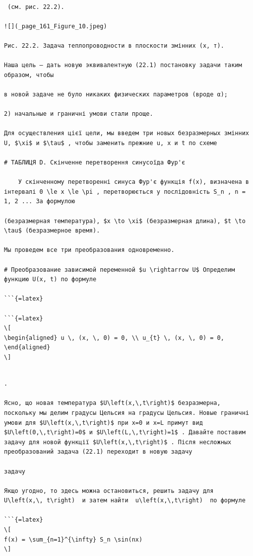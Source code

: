 \documentclass[
  ukrainian,
]{article}
\begin{document}
\begin{verbatim}

 (см. рис. 22.2).

![](_page_161_Figure_10.jpeg)

Рис. 22.2. Задача теплопроводности в плоскости змінних (х, т).

Наша цель — дать новую эквивалентную (22.1) постановку задачи таким образом, чтобы

в новой задаче не було никаких физических параметров (вроде α);

2) начальные и граничні умови стали проще.

Для осуществления цієї цели, мы введем три новых безразмерных змінних U, $\xi$ и $\tau$ , чтобы заменить прежние u, x и t по схеме

# ТАБЛИЦЯ D. Скінченне перетворення синусоїда Фур'є

    У скінченному перетворенні синуса Фур'є функція f(x), визначена в інтервалі 0 \le x \le \pi , перетворюється у послідовність S_n , n = 1, 2 ... За формулою

(безразмерная температура), $x \to \xi$ (безразмерная длина), $t \to \tau$ (безразмерное время).

Мы проведем все три преобразования одновременно.

# Преобразование зависимой переменной $u \rightarrow U$ Определим функцию U(x, t) по формуле

```{=latex}

```{=latex}
\[
\begin{aligned} u \, (x, \, 0) = 0, \\ u_{t} \, (x, \, 0) = 0, \end{aligned}
\]
\end{verbatim}

\begin{verbatim}

.

Ясно, що новая температура $U\left(x,\,t\right)$ безразмерна, поскольку мы делим градусы Цельсия на градусы Цельсия. Новые граничні умови для $U\left(x,\,t\right)$ при x=0 и x=L примут вид $U\left(0,\,t\right)=0$ и $U\left(L,\,t\right)=1$ . Давайте поставим задачу для новой функції $U\left(x,\,t\right)$ . Після несложных преобразований задача (22.1) переходит в новую задачу

задачу

Якщо угодно, то здесь можна остановиться, решить задачу для  U\left(x,\, t\right)  и затем найти  u\left(x,\,t\right)  по формуле

```{=latex}
\[
f(x) = \sum_{n=1}^{\infty} S_n \sin(nx)
\]
\end{verbatim}
\end{document}
